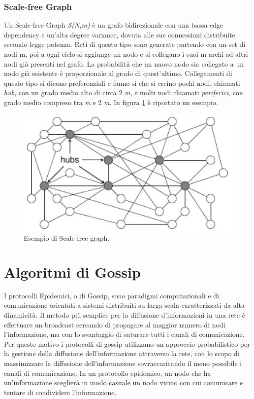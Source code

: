 \subsubsection{Scale-free Graph}
Un Scale-free Graph \textit{S(N,m)} è un grafo bidirezionale con una bassa edge dependency e un'alta degree variance, dovuta alle sue connessioni distribuite secondo legge potenza. Reti di questo tipo sono generate partendo con un set di nodi m, poi a ogni ciclo si aggiunge un nodo e si collegano i suoi m archi ad altri nodi già presenti nel grafo. La probabilità che un nuovo nodo sia collegato a un nodo già esistente è proporzionale al grado di quest'ultimo. Collegamenti di questo tipo si dicono preferenziali e fanno si che si creino pochi nodi, chiamati \textit{hub}, con un grado medio alto di circa 2 \textit{m}, e molti nodi chiamati \textit{periferici}, con grado medio compreso tra \textit{m} e 2 \textit{m}. In figura \ref{fig:scale-free} è riportato un esempio.
\bigskip
\begin{figure}[h]
	\centering
	\includegraphics[width=0.7\linewidth,keepaspectratio]{Images/reti/scale-free}
	\caption[Scale-free graph]{Esempio di Scale-free graph.}
	\label{fig:scale-free}
\end{figure}


\section{Algoritmi di Gossip}
I protocolli Epidemici, o di Gossip, sono paradigmi computazionali e di comunicazione orientati a sistemi distribuiti su larga scala caratterizzati da alta dinamicità. Il metodo più semplice per la diffusione d’informazioni in una rete è effettuare un broadcast cercando di propagare al maggior numero di nodi l’informazione, ma con lo svantaggio di saturare tutti i canali di comunicazione. Per questo motivo i protocolli di gossip utilizzano un approccio probabilistico per la gestione della diffusione dell’informazione attraverso la rete, con lo scopo di massimizzare la diffusione dell’informazione sovraccaricando il meno possibile i canali di comunicazione. In un protocollo epidemico, un nodo che ha un’informazione sceglierà in modo casuale un nodo vicino con cui comunicare e tentare di condividere l’informazione.

